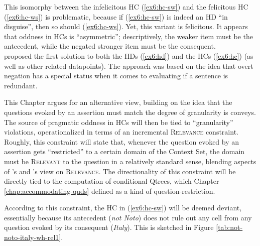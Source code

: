 This isomorphy between the infelicitous HC (\ref{ex6:hc-sw}) and the felicitous HC (\ref{ex6:hc-ws}) is problematic, because if (\ref{ex6:hc-sw}) is indeed an HD ``in disguise'', then so should (\ref{ex6:hc-ws}). Yet, this variant is felicitous. It appears that oddness in HCs is ``asymmetric''; descriptively,  the weaker item must be the antecedent, while the negated stronger item must be the consequent.\\


\citet{Kalomoiros2024} proposed the first solution to both the HDs (\ref{ex6:hd}) and  the HCs (\ref{ex6:hc}) (as well as other related datapoints). The approach was based on the idea that overt negation has a special status when it comes to evaluating if a sentence is redundant.

This Chapter argues for an alternative view, building on the idea that the questions evoked by an assertion must match the degree of granularity is conveys. The source of pragmatic oddness in HCs will then be tied to ``granularity'' violations, operationalized in terms of an incremental \textsc{Relevance} constraint. Roughly, this constraint will state that, whenever the question evoked by an assertion gets ``restricted'' to a certain domain of the Context Set, the domain must be \textsc{Relevant} to the question in a relatively standard sense, blending aspects of \citeauthor{Lewis1988}'s and \citeauthor{Roberts2012}'s view on \textsc{Relevance}. The directionality of this constraint will be directly tied to the computation of conditional Qtrees, which Chapter \ref{chap:accommodating-quds} defined as a kind of question-restriction.

According to this constraint, the HC in (\ref{ex6:hc-sw}) will be deemed deviant, essentially because its antecedent (\textit{not Noto}) does not rule out any cell from any question evoked by its consequent (\textit{Italy}). This is sketched in Figure \ref{tab:not-noto-italy-wh-rel1}.

